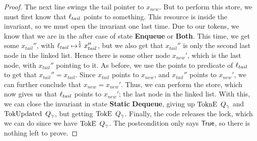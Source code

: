 \documentclass[a4paper, 11pt]{report}
\newcommand{\StaticState}{\textbf{Static}}
\newcommand{\EnqueueState}{\textbf{Enqueue}}
\newcommand{\DequeueState}{\textbf{Dequeue}}
\newcommand{\BothState}{\textbf{Both}}
\newcommand{\Qg}{Q_\gname}
\newcommand{\TokE}[1]{\operatorname{TokE}\ #1}
\newcommand{\TokEQg}{\TokE{\Qg}}
\newcommand{\ToknE}[1]{\operatorname{ToknE}\ #1}
\newcommand{\ToknEQg}{\ToknE{\Qg}}
\newcommand{\TokUpdated}[1]{\operatorname{TokUpdated}\ #1}
\newcommand{\TokUpdatedQg}{\TokUpdated{\Qg}}
\begin{document}
\begin{proof}
The next line swings the tail pointer to $x_{new}$. But to perform this store, we must first know that $\ell_{tail}$ points to something. This resource is inside the invariant, so we must open the invariant one last time. Due to our tokens, we know that we are in the after case of state \EnqueueState{} or \BothState{}. This time, we get some $x_{tail}''$, with $\ell_{tail} \mapsto^{\frac{1}{2}} x_{tail}''$, but we also get that $x_{tail}''$ is only the second last node in the linked list. Hence there is some other node $x_{new}'$, which is the last node, with $x_{tail}''$ pointing to it. As before, we use the points to predicate of $\ell_{tail}$ to get that $x_{tail}'' = x_{tail}$. Since $x_{tail}$ points to $x_{new}$, and $x_{tail}''$ points to $x_{new}'$, we can further conclude that $x_{new} = x_{new}'$. Thus, we can perform the store, which now gives us that $\ell_{tail}$ points to $x_{new}'$; the last node in the linked list. With this, we can close the invariant in state \StaticState{} \DequeueState{}, giving up $\ToknEQg$ and $\TokUpdatedQg$, but getting $\TokEQg$. Finally, the code releases the lock, which we can do since we have $\TokEQg$. The postcondition only says $\textsf{True}$, so there is nothing left to prove.
\end{proof}
\end{document}
